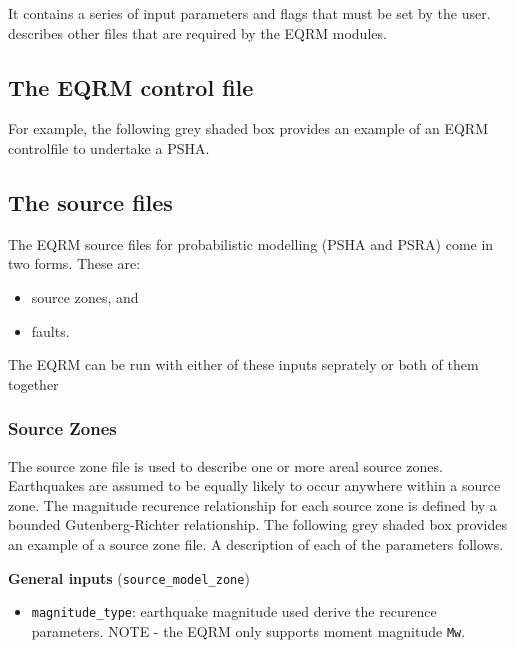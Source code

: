 It contains a series of input parameters and flags that must be set
by the user.  describes other files
that are required by the EQRM modules.

\subsection{The EQRM control file}
\label{sec:application-EQRMcf}




\clearpage For example, the following grey shaded box provides an
example of an EQRM controlfile to undertake a PSHA.




\clearpage
\subsection{The source files}

The EQRM source files for probabilistic modelling (PSHA and PSRA)
come in two forms. These are:
\begin{itemize}
\item source zones, and
\item faults.
\end{itemize}
The EQRM can be run with either of these inputs seprately or both of
them together


\subsubsection{Source Zones}
\label{sec:source-zone-file}

The source zone file is used to describe one or more areal source
zones. Earthquakes are assumed to be equally likely to occur
anywhere within a source zone. The magnitude recurence relationship
for each source zone is defined by a bounded Gutenberg-Richter
relationship. The following grey shaded box provides an example of a
source zone file. A description of each of the parameters follows.


\textbf{General inputs} (\texttt{source\_model\_zone})
\begin{itemize}
\item \texttt{magnitude\_type}: earthquake magnitude used derive the
recurence parameters. NOTE - the EQRM only supports moment magnitude
\texttt{Mw}.
\end{itemize}

